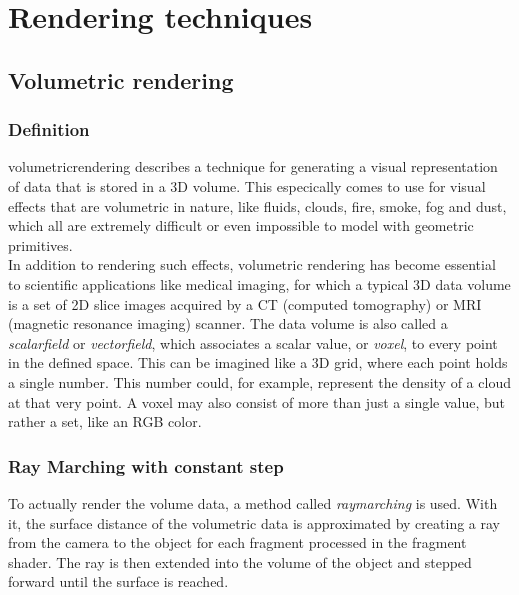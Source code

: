 \section{Rendering techniques}

\subsection{Volumetric rendering}
\label{section:volumetric-rendering}

\subsubsection{Definition}
\Gls{volumetricrendering} describes a technique for generating a visual representation of data that is stored in a 3D volume. 
This especically comes to use for visual effects that are volumetric in nature, like fluids, clouds, fire, smoke, fog and dust, which all are extremely difficult or even impossible to model with geometric primitives.
\\
In addition to rendering such effects, volumetric rendering has become essential to scientific applications like medical imaging, for which a typical 3D data volume is a set of 2D slice images acquired by a CT (computed tomography) or MRI (magnetic resonance imaging) scanner.
\emptyline
The data volume is also called a \textit{\gls{scalarfield}} or \textit{\gls{vectorfield}}, which associates a scalar value, or \textit{\gls{voxel}}, to every point in the defined space.
This can be imagined like a 3D grid, where each point holds a single number. This number could, for example, represent the density of a cloud at that very point.
A \gls{voxel} may also consist of more than just a single value, but rather a set, like an RGB color.

\subsubsection{Ray Marching with constant step}
To actually render the volume data, a method called \textit{\gls{raymarching}} is used. With it, the surface distance of the volumetric data is approximated by creating a ray from the camera to the object for each fragment processed in the fragment shader. The ray is then extended into the volume of the object and stepped forward until the surface is reached.

